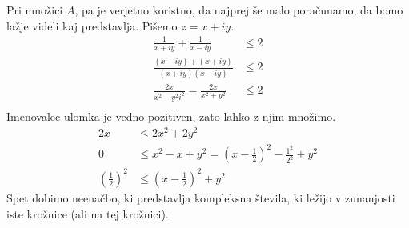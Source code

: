 \documentclass[12pt,a4paper,slovene]{article}
\begin{document}
\begin{enumerate}[(1)]
    Pri množici $A$, pa je verjetno koristno, da najprej še malo poračunamo, da bomo lažje videli kaj predstavlja. Pišemo $z = x + iy$.
    \begin{align*}
        \frac{1}{x + iy} + \frac{1}{x - iy} &\leq 2\\
        \frac{(x - iy) + (x + iy)}{(x + iy)(x - iy)} &\leq 2\\
        \frac{2x}{x^2 - y^2i^2} = \frac{2x}{x^2 + y^2} &\leq 2\\
    \end{align*}
    Imenovalec ulomka je vedno pozitiven, zato lahko z njim množimo.
    \begin{align*}
        2x &\leq 2x^2 + 2y^2\\
        0 &\leq x^2 - x + y^2 = (x - \frac{1}{2})^2 - \frac{1^2}{2^2} + y^2\\
        \left( \frac{1}{2} \right)^2 &\leq (x - \frac{1}{2})^2 + y^2
    \end{align*}
    Spet dobimo neenačbo, ki predstavlja kompleksna števila, ki ležijo v zunanjosti iste krožnice (ali na tej krožnici).



\end{enumerate}
\end{document}
